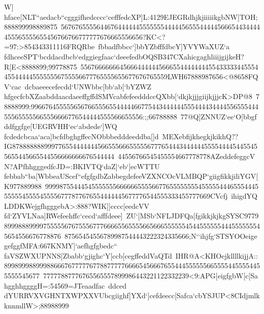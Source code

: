 {{{ W]}
 \hbox{hface[NLT``aedacb``cgggifhedcccc`cefffedcXP]L:4129EJEGRdhjkjiiiiikgbNW]TOH;888899998889875%
 56767655556446764444445555555444445655544444566654434444455565555655456766766777777676665556656?KC<?=97:>854343311116FRQRbe%
 fbbadfbbcc`]bbYZbfffdbcY]YVYWaXUZ`a}
 \hbox{fdhceeSPT`bcddacdbcb`edggiegfaac`deeefedbOQSB347CXahicgaghliiijgijkeH?R[E<8888899;99778875%
 556766666664566644444456665544444444554333334455544554444455555556755556677765555655677676765559LWH67888987656<@8658FQV`cac%
 dcbaeeecefecdd`UNWbbc[bb`ab[`bYZWZ}
 \hbox{hfgecfcbXZaabddaacdaeeffgffdSMVcabfefeedddccQXbb[`dkjkjjjgiijkjjjcK>DP@8%
 78888999:9966764555556567665556554444466775443444444555444434444556555444555655555665556666776544444555566655556:;;66788888%
 77@Q]ZNNUZ`ee`O[bbgfddfggfge[UEGRVHH`ec`abdede`]WQ}
 \hbox{fcdedcbcaa`aca]bcfdbghgffecNObbbedddeeddba[]d%
 MEXebfijkhegkjkikhQ??IG8788888889997765544444445665556665555567776544434444445555444454455455655445665544556666666676544444%
 44556766545455554667778778AZeddefeggcVN?APfhhgggedfcJD=:BKIVTQ`daZ]`eb`]ecWTTU}
 \hbox{febbab``ba[WbbeaUScef``efgfgdbZabbegdefeeVZXNCOcVLMBQP`giigfikkjiliYGV[K977889988%
 9999875544454555555566666655556677655555555455555444655544455555545555455556777877676554444445677776544555333455777669CVcfj%
 ihigdYQLDDKWejgfhgggebA>:888?WIK]]cccc[eedcVV}
 \hbox{fd`ZYVLNaa]RWefeehffc`cecd`afffdeee]%
 ZU`[MSb`NFLJDFQa[fgikkjkjkgSYSC97798999888999975555567675556777666655655556656665555554544555555444555555545654556676778876%
 87565454556789987544443222324335666;N``ihjfg`STSYOOeigegefggfMFA:667KNMY]`aefhgfgbedc``}
 \hbox{faVSZWXUPNNS[Zbabb`gjighc`Y[ccb[cegffeddVaQTd%
 IHR@A<KHOejkllllkijjA::8998999889998866676777776778877777666654566676554445555556655554455554455555545677%
 77777887776765565557899986443221122332239<9:APG[eigfgbW[c[SahgghhggggH=:54569=JTeaadfac%
 ddced}
 \hbox{dYURRVXVGHNTXWPXXVUbcgiighf]YXd`]cefdeecc[Safca`cbYSJUP<8CIdjmlkknnmllW>;88988999%
}}}
